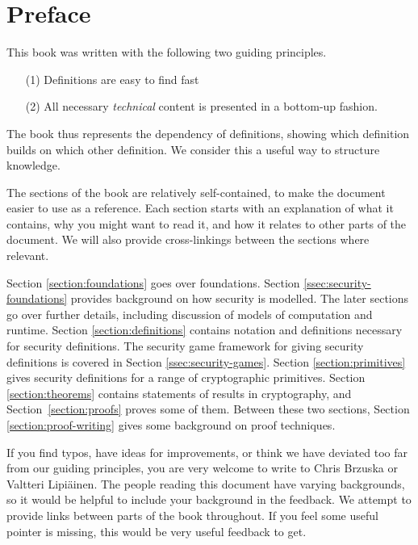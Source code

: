 \section*{Preface}
This book was written with the following two guiding principles.
\begin{itemize}
    \item[(1)] Definitions are easy to find fast
    \item[(2)] All necessary \emph{technical} content is presented in a bottom-up fashion.
\end{itemize}
The book thus represents the dependency of definitions, showing which definition builds on which other definition. We consider this a useful way to structure knowledge.

The sections of the book are relatively self-contained, to make the document easier to use as a reference. Each section starts with an explanation of what it contains, why you might want to read it, and how it relates to other parts of the document. We will also provide cross-linkings between the sections where relevant.

Section \ref{section:foundations} goes over foundations. Section \ref{ssec:security-foundations} provides background on how security is modelled. The later sections go over further details, including discussion of models of computation and runtime. Section \ref{section:definitions} contains notation and definitions necessary for security definitions. The security game framework for giving security definitions is covered in Section \ref{ssec:security-games}. Section \ref{section:primitives} gives security definitions for a range of cryptographic primitives. Section \ref{section:theorems} contains statements of results in cryptography, and Section~\ref{section:proofs} proves some of them. Between these two sections, Section \ref{section:proof-writing} gives some background on proof techniques.

If you find typos, have ideas for improvements, or think we have deviated too far from our guiding principles, you are very welcome to write to Chris Brzuska or Valtteri Lipi{\"a}inen. The people reading this document have varying backgrounds, so it would be helpful to include your background in the feedback. We attempt to provide links between parts of the book throughout. If you feel some useful pointer is missing, this would be very useful feedback to get.